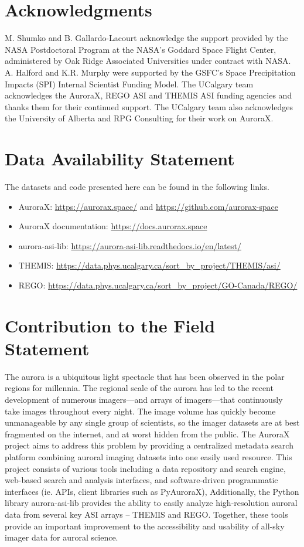 \documentclass[utf8]{FrontiersinHarvard} %
\begin{document}
\section*{Acknowledgments}
M. Shumko and B. Gallardo-Lacourt acknowledge the support provided by the NASA Postdoctoral Program at the NASA’s Goddard Space Flight Center, administered by Oak Ridge Associated Universities under contract with NASA. A. Halford and K.R. Murphy were supported by the GSFC's Space Precipitation Impacts (SPI) Internal Scientist Funding Model. The UCalgary team acknowledges the AuroraX, REGO ASI and THEMIS ASI funding agencies and thanks them for their continued support. The UCalgary team also acknowledges the University of Alberta and RPG Consulting for their work on AuroraX. 

\section*{Data Availability Statement}
The datasets and code presented here can be found in the following links.
\begin{itemize}
    \item AuroraX: \url{https://aurorax.space/} and \url{https://github.com/aurorax-space}
    \item AuroraX documentation: \url{https://docs.aurorax.space}
    \item aurora-asi-lib: \url{https://aurora-asi-lib.readthedocs.io/en/latest/}
    \item THEMIS: \url{https://data.phys.ucalgary.ca/sort_by_project/THEMIS/asi/}
    \item REGO: \url{https://data.phys.ucalgary.ca/sort_by_project/GO-Canada/REGO/}
\end{itemize}

\section*{Contribution to the Field Statement}
\noindent The aurora is a ubiquitous light spectacle that has been observed in the polar regions for millennia. The regional scale of the aurora has led to the recent development of numerous imagers---and arrays of imagers---that continuously take images throughout every night. The image volume has quickly become unmanageable by any single group of scientists, so the imager datasets are at best fragmented on the internet, and at worst hidden from the public. The AuroraX project aims to address this problem by providing a centralized metadata search platform combining auroral imaging datasets into one easily used resource. This project consists of various tools including a data repository and search engine, web-based search and analysis interfaces, and software-driven programmatic interfaces (ie. APIs, client libraries such as PyAuroraX), Additionally, the Python library aurora-asi-lib provides the ability to easily analyze high-resolution auroral data from several key ASI arrays – THEMIS and REGO. Together, these tools provide an important improvement to the accessibility and usability of all-sky imager data for auroral science.

 

\end{document}
